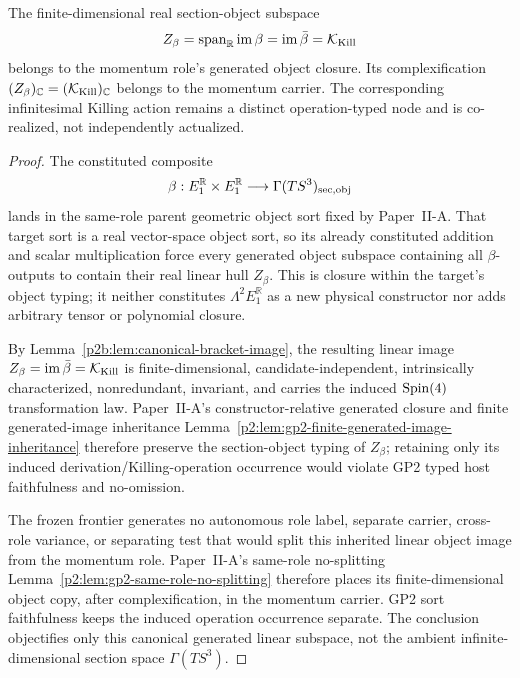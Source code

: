 \documentclass[12pt,a4paper]{article}
\begin{document}
\begin{corollary}
\label{p2b:cor:bracket-image-same-carrier}
The finite-dimensional real section-object subspace
\[
 Z_\beta
 =\operatorname{span}_{\mathbb R}\operatorname{im}\beta
 =\operatorname{im}\bar\beta
 =\mathcal K_{\rm Kill}
\]
belongs to the momentum role's generated object closure.  Its complexification
\((Z_\beta)_{\mathbb C}=(\mathcal K_{\rm Kill})_{\mathbb C}\) belongs to the
momentum carrier.  The corresponding infinitesimal Killing action remains
a distinct operation-typed node and is co-realized, not independently
actualized.
\end{corollary}

\begin{proof}
The constituted composite
\[
 \beta:E_1^{\mathbb R}\times E_1^{\mathbb R}
 \longrightarrow\Gamma(TS^3)_{\rm sec,obj}
\]
lands in the same-role parent geometric object sort fixed by Paper~II-A.
That target sort is a real vector-space object sort, so its already
constituted addition and scalar multiplication force every generated object
subspace containing all \(\beta\)-outputs to contain their real linear hull
\(Z_\beta\).  This is closure within the target's object typing; it neither
constitutes \(\Lambda^2E_1^{\mathbb R}\) as a new physical constructor nor
adds arbitrary tensor or polynomial closure.

By Lemma~\ref{p2b:lem:canonical-bracket-image}, the resulting linear image
\(Z_\beta=\operatorname{im}\bar\beta=\mathcal K_{\rm Kill}\) is
finite-dimensional, candidate-independent, intrinsically characterized,
nonredundant, invariant, and carries the induced \(\mathrm{Spin}(4)\) transformation
law.  Paper~II-A's constructor-relative generated closure and finite
generated-image inheritance
Lemma~\ref{p2:lem:gp2-finite-generated-image-inheritance} therefore preserve
the section-object typing of \(Z_\beta\); retaining only its induced
derivation/Killing-operation occurrence would violate GP2 typed host
faithfulness and no-omission.

The frozen frontier generates no autonomous role label, separate carrier,
cross-role variance, or separating test that would split this inherited
linear object image from the momentum role.  Paper~II-A's same-role
no-splitting Lemma~\ref{p2:lem:gp2-same-role-no-splitting} therefore places
its finite-dimensional object copy, after complexification, in the momentum
carrier.  GP2 sort faithfulness keeps the induced operation occurrence
separate.  The conclusion objectifies only this canonical generated linear
subspace, not the ambient infinite-dimensional section space
\(\Gamma(TS^3)\).
\end{proof}
\end{document}

